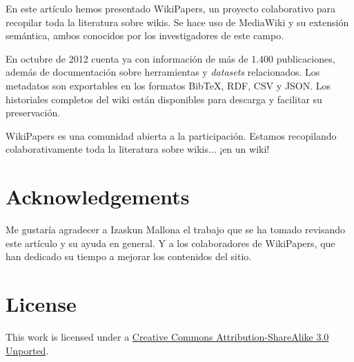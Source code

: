 \documentclass[11pt,twocolumn]{article}
\begin{document}
En este artículo hemos presentado WikiPapers, un proyecto colaborativo para recopilar toda la literatura sobre wikis. Se hace uso de MediaWiki y su extensión semántica, ambos conocidos por los investigadores de este campo.

En octubre de 2012 cuenta ya con información de más de 1.400 publicaciones, además de documentación sobre herramientas y \emph{datasets} relacionados. Los metadatos son exportables en los formatos BibTeX, RDF, CSV y JSON. Los historiales completos del wiki están disponibles para descarga y facilitar su preservación. 

WikiPapers es una comunidad abierta a la participación. Estamos recopilando colaborativamente toda la literatura sobre wikis... ¡en un wiki!

%



\section*{Acknowledgements}

Me gustaría agradecer a Izaskun Mallona el trabajo que se ha tomado revisando este artículo y su ayuda en general. Y a los colaboradores de WikiPapers, que han dedicado su tiempo a mejorar los contenidos del sitio.

\section*{License}
This work is licensed under a \href{http://creativecommons.org/licenses/by-sa/3.0/}{Creative Commons Attribution-ShareAlike 3.0 Unported}.
\end{document}
